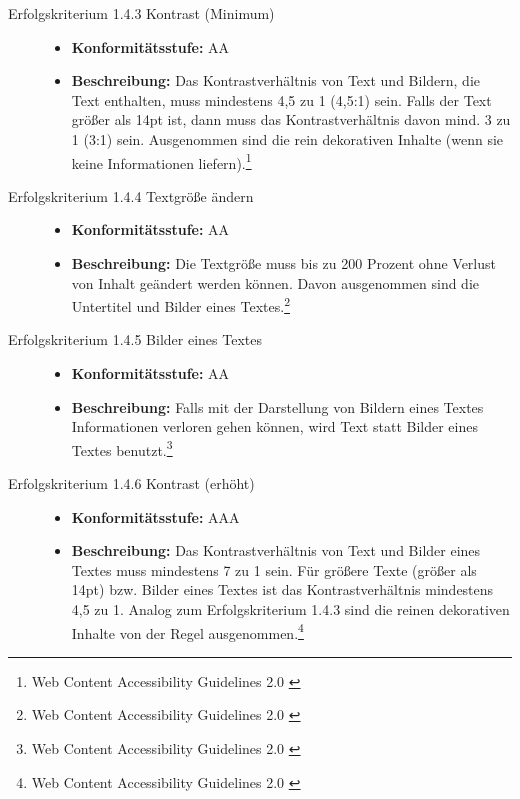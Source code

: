 \begin{description}
\begin{description}
		\item[Erfolgskriterium 1.4.3 Kontrast (Minimum)]\hfill
		\begin{itemize}
			\item \textbf{Konformitätsstufe:} AA
			\item \textbf{Beschreibung:} Das Kontrastverhältnis von Text und Bildern, die Text enthalten, muss mindestens 4,5 zu 1 (4,5:1) sein. Falls der Text größer 
			als 14pt ist, dann muss das Kontrastverhältnis davon mind. 3 zu 1 (3:1) sein. Ausgenommen sind die rein dekorativen Inhalte (wenn sie keine Informationen
			 liefern).\footnote{Web Content Accessibility Guidelines 2.0 \cite{WCAG2.0}}
		\end{itemize}
		
		\item[Erfolgskriterium 1.4.4 Textgröße ändern]\hfill
		\begin{itemize}
			\item \textbf{Konformitätsstufe:} AA
			\item \textbf{Beschreibung:} Die Textgröße muss bis zu 200 Prozent ohne Verlust von Inhalt geändert werden können. Davon ausgenommen sind die 
			Untertitel und Bilder eines Textes.\footnote{Web Content Accessibility Guidelines 2.0 \cite{WCAG2.0}}
		\end{itemize}
		
		\item[Erfolgskriterium 1.4.5 Bilder eines Textes]\hfill
		\begin{itemize}
			\item \textbf{Konformitätsstufe:} AA
			\item \textbf{Beschreibung:} Falls mit der Darstellung von Bildern eines Textes Informationen verloren gehen können, wird Text statt Bilder eines Textes 
			benutzt.\footnote{Web Content Accessibility Guidelines 2.0 \cite{WCAG2.0}}
		\end{itemize}
		
		\item[Erfolgskriterium 1.4.6 Kontrast (erhöht)]\hfill
		\begin{itemize}
			\item \textbf{Konformitätsstufe:} AAA
			\item \textbf{Beschreibung:} Das Kontrastverhältnis von Text und Bilder eines Textes muss mindestens 7 zu 1 sein. Für größere Texte (größer als 14pt) bzw. 
			Bilder eines Textes ist das Kontrastverhältnis mindestens 4,5 zu 1. Analog zum Erfolgskriterium 1.4.3 sind die reinen dekorativen Inhalte von 
			der Regel ausgenommen.\footnote{Web Content Accessibility Guidelines 2.0 \cite{WCAG2.0}}
		\end{itemize}
		

\end{description}
\end{description}
